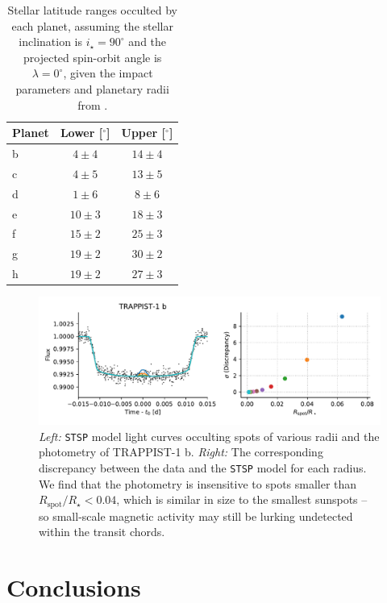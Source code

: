 \begin{table}
\centering
\begin{tabular}{lcc}
Planet & Lower [$^\circ$] & Upper [$^\circ$] \\ \hline
b & $4 \pm 4$ & $14 \pm 4$ \\
c & $4 \pm 5$ & $13 \pm 5$ \\
d & $1 \pm 6$ & $8 \pm 6$ \\
e & $10 \pm 3$ & $18 \pm 3$ \\
f & $15 \pm 2$ & $25 \pm 3$ \\
g & $19 \pm 2$ & $30 \pm 2$ \\
h & $19 \pm 2$ & $27 \pm 3$
\end{tabular}
\caption{Stellar latitude ranges occulted by each planet, assuming the stellar inclination is $i_\star = 90^\circ$ and the projected spin-orbit angle is $\lambda = 0^\circ$, given the impact parameters and planetary radii from \citet{Delrez2018}. \label{tab}}
\end{table}

\begin{figure}
    \centering
    \includegraphics[scale=0.7]{trappist1_robin/spots.pdf}
    \caption{{\it Left:} \texttt{STSP} model light curves occulting spots of various radii and the \spitzer photometry of TRAPPIST-1 b. {\it Right:} The corresponding discrepancy between the data and the \texttt{STSP} model for each radius. We find that the photometry is insensitive to spots smaller than $R_\mathrm{spot}/R_\star < 0.04$, which is similar in size to the smallest sunspots -- so small-scale magnetic activity may still be lurking undetected within the transit chords.}
    \label{fig:stsp}
\end{figure}

\section{Conclusions}

